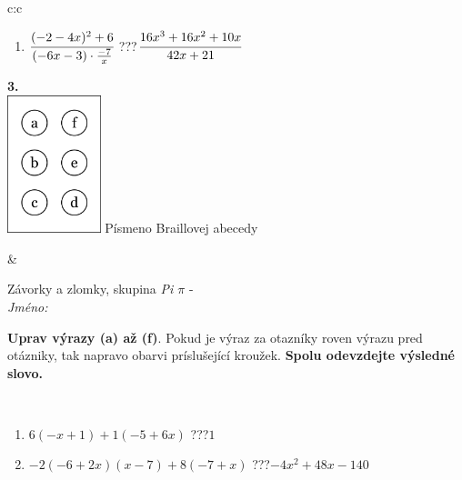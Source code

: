 \documentclass[10pt]{report}
\begin{document}
\begin{tabular}{c:c}
\begin{minipage}[c][104.5mm][t]{0.5\linewidth}
\begin{center}
\begin{minipage}{0.79\linewidth}
\begin{center}
\begin{varwidth}{\linewidth}
\begin{enumerate}
\item $\cfrac{(-2-4x)^2+6}{(-6x-3)\cdot\frac{-7}{x}}$\quad \dotfill\; ???\;\dotfill \quad $\cfrac{16x^3+16x^2+10x}{42x+21}$
\end{enumerate}
\end{varwidth}
\end{center}
\end{minipage}
\begin{minipage}{0.20\linewidth}
\begin{center}
{\Huge\bfseries 3.} \\[2mm]
\includegraphics[height=40mm]{../images/braille.png}
{\small Písmeno Braillovej abecedy}
\end{center}
\end{minipage}
\end{center}
\end{minipage}
&
\begin{minipage}[c][104.5mm][t]{0.5\linewidth}
\begin{center}
\vspace{7mm}
{\huge Závorky a zlomky, skupina \textit{Pi $\pi$} -}\\[5mm]
\textit{Jméno:}\phantom{xxxxxxxxxxxxxxxxxxxxxxxxxxxxxxxxxxxxxxxxxxxxxxxxxxxxxxxxxxxxxxxxx}\\[5mm]
\begin{minipage}{0.95\linewidth}
\begin{center}
\textbf{Uprav výrazy (a) až (f)}. Pokud je výraz za otazníky roven výrazu pred otázniky, tak napravo obarvi príslušející kroužek. \textbf{Spolu odevzdejte výsledné slovo.}
\end{center}
\end{minipage}
\\[1mm]
\begin{minipage}{0.79\linewidth}
\begin{center}
\begin{varwidth}{\linewidth}
\begin{enumerate}
\normalsize
\item $6(-x+1)+1(-5+6x)$\quad \dotfill\; ???\;\dotfill \quad $1$
\item $-2(-6+2x)(x-7)+8(-7+x)$\quad \dotfill\; ???\;\dotfill \quad $-4x^2+48x-140$

\end{enumerate}
\end{varwidth}
\end{center}
\end{minipage}
\end{center}
\end{minipage}
\end{tabular}
\end{document}
